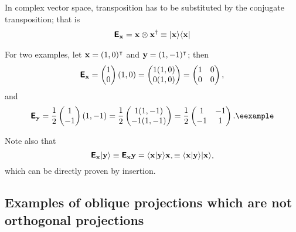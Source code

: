 In complex vector space, transposition has to be substituted by the conjugate transposition;
that is
\begin{equation}
\begin{split}
\textsf{\textbf{E}}_{\bf x} = {\bf x} \otimes {\bf x}^\dagger \equiv \vert{\bf x}\rangle \langle {\bf x}\vert
\end{split}
\end{equation}

{
\color{blue}
\bexample
For two examples, let
${\bf x}=(1,0)^\intercal $
and
${\bf y}=(1,-1)^\intercal $;
then
$$
\textsf{\textbf{E}}_{\bf x}
=
\begin{pmatrix}
1\\
0
\end{pmatrix}
(1,0)
=
\begin{pmatrix}
1(1,0)\\
0(1,0)
\end{pmatrix}
=
\begin{pmatrix}
1&0\\
0&0
\end{pmatrix}
,
$$
and
$$
\textsf{\textbf{E}}_{\bf y}
= \frac{1}{2}
\begin{pmatrix}
1\\
-1
\end{pmatrix}
(1,-1)
= \frac{1}{2}
\begin{pmatrix}
1(1,-1)\\
-1(1,-1)
\end{pmatrix}
= \frac{1}{2}
\begin{pmatrix}
1&-1\\
-1&1
\end{pmatrix}
.
\textrm{\eexample}
$$
}

Note also that
\begin{equation}
\textsf{\textbf{E}}_{\bf x} \vert {\bf y}\rangle
\equiv
\textsf{\textbf{E}}_{\bf x} {\bf y}
=
\langle {\bf x}\vert  {\bf y} \rangle {\bf x},
\equiv
\langle {\bf x}\vert  {\bf y} \rangle \vert {\bf x}\rangle ,
\end{equation}
which can be directly proven by insertion.





\subsection{Examples of oblique projections which are not orthogonal projections}

